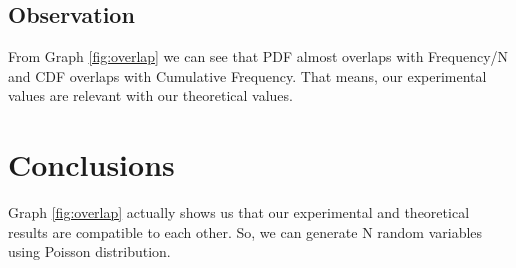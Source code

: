 \documentclass[12pt]{article}
\begin{document}
\subsection{Observation}
From Graph \ref{fig:overlap} we can see that PDF almost overlaps with Frequency/N and CDF overlaps with Cumulative Frequency. That means, our experimental values are relevant with our theoretical values. 

\section{Conclusions}
Graph \ref{fig:overlap} actually shows us that our experimental and theoretical results are compatible to each other. So, we can generate N random variables using Poisson distribution. 
\end{document}
